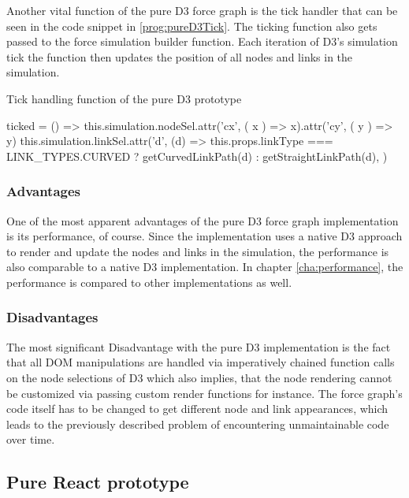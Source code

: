 Another vital function of the pure D3 force graph is the tick handler that can be seen in the code snippet in \ref{prog:pureD3Tick}. The ticking function also gets passed to the force simulation builder function. Each iteration of D3's simulation tick the function then updates the position of all nodes and links in the simulation.

\begin{program}[H]
\caption{Tick handling function of the pure D3 prototype}
\label{prog:pureD3Tick}
\begin{JsCode}
ticked = () => {
  this.simulation.nodeSel.attr('cx', ({ x }) => x).attr('cy', ({ y }) => y)
  this.simulation.linkSel.attr('d', (d) =>
    this.props.linkType === LINK_TYPES.CURVED ? getCurvedLinkPath(d) : getStraightLinkPath(d),
  )
}
\end{JsCode}
\end{program}

\subsubsection{Advantages}

One of the most apparent advantages of the pure D3 force graph implementation is its performance, of course. Since the implementation uses a native D3 approach to render and update the nodes and links in the simulation, the performance is also comparable to a native D3 implementation. In chapter \ref{cha:performance}, the performance is compared to other implementations as well.

\subsubsection{Disadvantages}

The most significant Disadvantage with the pure D3 implementation is the fact that all DOM manipulations are handled via imperatively chained function calls on the node selections of D3 which also implies, that the node rendering cannot be customized via passing custom render functions for instance. The force graph's code itself has to be changed to get different node and link appearances, which leads to the previously described problem of encountering unmaintainable code over time.

\subsection{Pure React prototype}

